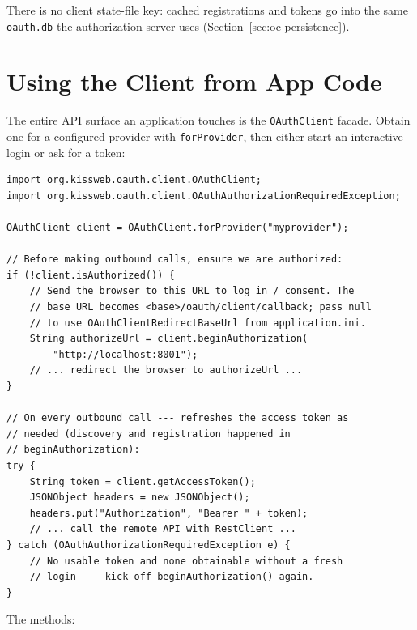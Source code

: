 \noindent
There is no client state-file key: cached registrations and tokens go into the same \texttt{oauth.db} the authorization server uses (Section~\ref{sec:oc-persistence}).

\section{Using the Client from App Code}
\label{sec:oc-usage}

The entire API surface an application touches is the \texttt{OAuthClient} facade.  Obtain one for a configured provider with \texttt{forProvider}, then either start an interactive login or ask for a token:

\begin{lstlisting}[style=java,basicstyle=\ttfamily\scriptsize]
import org.kissweb.oauth.client.OAuthClient;
import org.kissweb.oauth.client.OAuthAuthorizationRequiredException;

OAuthClient client = OAuthClient.forProvider("myprovider");

// Before making outbound calls, ensure we are authorized:
if (!client.isAuthorized()) {
    // Send the browser to this URL to log in / consent. The
    // base URL becomes <base>/oauth/client/callback; pass null
    // to use OAuthClientRedirectBaseUrl from application.ini.
    String authorizeUrl = client.beginAuthorization(
        "http://localhost:8001");
    // ... redirect the browser to authorizeUrl ...
}

// On every outbound call --- refreshes the access token as
// needed (discovery and registration happened in
// beginAuthorization):
try {
    String token = client.getAccessToken();
    JSONObject headers = new JSONObject();
    headers.put("Authorization", "Bearer " + token);
    // ... call the remote API with RestClient ...
} catch (OAuthAuthorizationRequiredException e) {
    // No usable token and none obtainable without a fresh
    // login --- kick off beginAuthorization() again.
}
\end{lstlisting}

\noindent
The methods:

